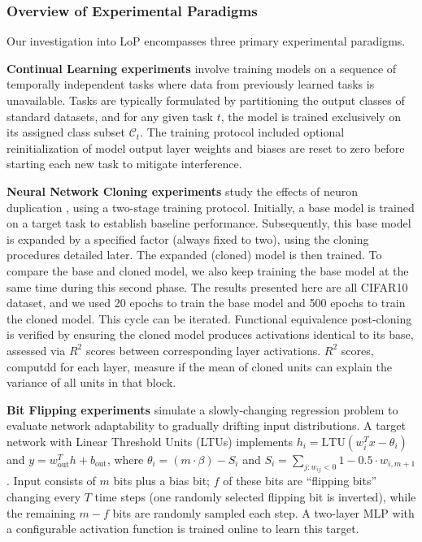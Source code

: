 \documentclass{article}
\numberwithin{figure}{section}
\begin{document}
\subsubsection{Overview of Experimental Paradigms}
\label{subsec:experiment_paradigms}

Our investigation into LoP encompasses three primary experimental paradigms.

\textbf{Continual Learning experiments} involve training models on a sequence of temporally independent tasks where data from previously learned tasks is unavailable. Tasks are typically formulated by partitioning the output classes of standard datasets, and for any given task $t$, the model is trained exclusively on its assigned class subset $\mathcal{C}_t$. The training protocol included optional reinitialization of model output layer weights and biases are reset to zero before starting each new task to mitigate interference.

\textbf{Neural Network Cloning experiments} study the effects of neuron duplication , using a two-stage training protocol. Initially, a base model is trained on a target task to establish baseline performance. Subsequently, this base model is expanded by a specified factor (always fixed to two), using the cloning procedures detailed later.  The expanded (cloned) model is then trained. To compare the base and cloned model, we also keep training the base model at the same time during this second phase. The results presented here are all CIFAR10 dataset, and we used 20 epochs to train the base model and 500 epochs to train the cloned model. This cycle can be iterated. Functional equivalence post-cloning is verified by ensuring the cloned model produces activations identical to its base, assessed via $R^2$ scores between corresponding layer activations. $R^2$ scores, computdd for each layer, measure if the mean of cloned units can explain the variance of all units in that block. 

\textbf{Bit Flipping experiments} simulate a slowly-changing regression problem to evaluate network adaptability to gradually drifting input distributions. A target network with Linear Threshold Units (LTUs) implements $h_i = \text{LTU}(w_i^T x - \theta_i)$ and $y = w_{\text{out}}^T h + b_{\text{out}}$, where $\theta_i = (m \cdot \beta) - S_i$ and $S_i = \sum_{j: w_{ij} < 0} 1 - 0.5 \cdot w_{i,m+1}$. Input consists of $m$ bits plus a bias bit; $f$ of these bits are ``flipping bits'' changing every $T$ time steps (one randomly selected flipping bit is inverted), while the remaining $m-f$ bits are randomly sampled each step. A two-layer MLP with a configurable activation function is trained online to learn this target.
\end{document}
